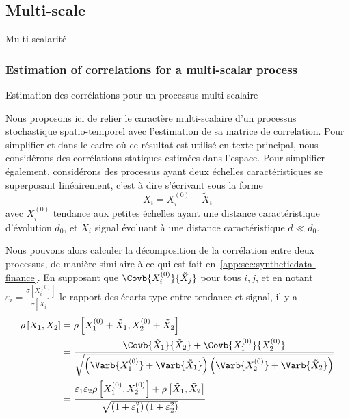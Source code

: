 
%




\subsection{Multi-scale}{Multi-scalarité}


\subsubsection{Estimation of correlations for a multi-scalar process}{Estimation des corrélations pour un processus multi-scalaire}

Nous proposons ici de relier le caractère multi-scalaire d'un processus stochastique spatio-temporel avec l'estimation de sa matrice de correlation. Pour simplifier et dans le cadre où ce résultat est utilisé en texte principal, nous considérons des corrélations statiques estimées dans l'espace. Pour simplifier également, considérons des processus ayant deux échelles caractéristiques se superposant linéairement, c'est à dire s'écrivant sous la forme
\[
X_i = X_i^{(0)} + \tilde{X}_i
\]
avec $X_i^{(0)}$ tendance aux petites échelles ayant une distance caractéristique d'évolution $d_0$, et $\tilde{X}_i$ signal évoluant à une distance caractéristique $d \ll d_0$.

Nous pouvons alors calculer la décomposition de la corrélation entre deux processus, de manière similaire à ce qui est fait en~\ref{app:sec:syntheticdata-finance}. En supposant que $\Covb{X_i^{(0)}}{\tilde{X}_j}$ pour tous $i,j$, et en notant $\varepsilon_i = \frac{\sigma\left[X_i^{(0)}\right]}{\sigma\left[\tilde{X}_i\right]}$ le rapport des écarts type entre tendance et signal, il y a
\[
\begin{split}
	\rho\left[X_1,X_2\right] & = \rho\left[X_1^{(0)} + \tilde{X}_1,X_2^{(0)} + \tilde{X}_2\right]\\
	& = \frac{\Covb{\tilde{X}_1}{\tilde{X}_2} + \Covb{X_1^{(0)}}{X_2^{(0)}}}{\sqrt{\left(\Varb{X_1^{(0)}} + \Varb{\tilde{X}_1}\right)\left(\Varb{X_2^{(0)}} + \Varb{\tilde{X}_2}\right)}}\\
	& = \frac{\varepsilon_1 \varepsilon_2\rho\left[X_1^{(0)},X_2^{(0)}\right] + \rho\left[\tilde{X}_1,\tilde{X}_2\right]}{\sqrt{\left(1 + \varepsilon_1^2\right)\left(1 + \varepsilon_2^2\right)}}
\end{split}
\]

